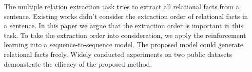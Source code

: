 The multiple relation extraction task tries to extract all relational facts from a sentence. Existing works didn't consider the extraction order of relational facts in a sentence. In this paper we argue that the extraction order is important in this task. To take the extraction order into consideration, we apply the reinforcement learning into a sequence-to-sequence model. The proposed model could generate relational facts freely. Widely conducted experiments on two public datasets demonstrate the efficacy of the proposed method.

